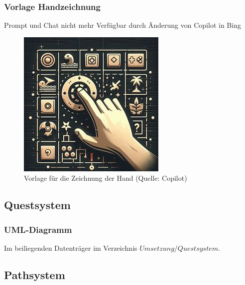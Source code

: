\documentclass[
	12pt,
	a4paper,
	bibtotoc,
	cleardoubleempty, 
	idxtotoc,
	ngerman,
	openright
	final,
	listof=nochaptergap,
	]{scrbook}
\begin{document}
\begin{appendices}
\subsubsection{Vorlage Handzeichnung}\label{sec:append_realisation_vorlage_handzeichnung}
Prompt und Chat nicht mehr Verfügbar durch Änderung von Copilot in Bing
\begin{figure}[ht]
\centering
\includegraphics[width=1\linewidth]{content/attachments/vorlagen/Vorlage_Hand.jpeg}
\caption{Vorlage für die Zeichnung der Hand (Quelle: Copilot)}
\label{fig:vorlage_hand}
\end{figure}


\subsection{Questsystem}

\subsubsection{UML-Diagramm}\label{sec:append_realisation_uml_quest}
Im beiliegenden Datenträger im Verzeichnis $Umsetzung/Questsystem$. 

\subsection{Pathsystem}


\end{appendices}
\end{document}
